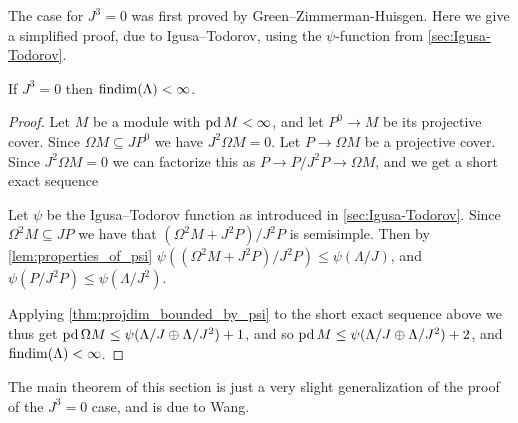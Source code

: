 The case for $J^3=0$ was first proved by Green--Zimmerman-Huisgen\cite[Theorem~16]{GZH91}. Here we give a simplified proof, due to Igusa--Todorov, using the $\psi$-function from \cref{sec:Igusa-Todorov}.

\begin{theorem}\cite[Corollary~6]{IgTo05}\label{thm:J3_equals_0_implies_FDC}
	If $J^3=0$ then $\operatorname{findim}(\Lambda) < \infty$.
	\begin{proof}
		Let $M$ be a module with $\operatorname{pd} M < \infty$, and let $P^0 \to M$ be its projective cover. Since $\Omega M \subseteq JP^0$ we have $J^2\Omega M = 0$. Let $P \to \Omega M$ be a projective cover. Since $J^2\Omega M = 0$ we can factorize this as $P \to P/J^2P \to \Omega M$, and we get a short exact sequence
		\begin{center}
		\end{center}
		Let $\psi$ be the Igusa--Todorov function as introduced in \cref{sec:Igusa-Todorov}. Since $\Omega^2 M \subseteq JP$ we have that $(\Omega^2 M + J^2P) / J^2 P$ is semisimple. Then by \cref{lem:properties_of_psi} $\psi((\Omega^2 M + J^2P) / J^2 P) \leq \psi(\Lambda / J)$, and $\psi(P / J^2 P) \leq \psi(\Lambda / J^2)$.
		
		Applying \cref{thm:projdim_bounded_by_psi} to the short exact sequence above we thus get $\operatorname{pd} \Omega M \leq \psi(\Lambda / J \oplus \Lambda / J^2) + 1$, and so $\operatorname{pd} M \leq \psi(\Lambda / J \oplus \Lambda / J^2) + 2$, and $\operatorname{findim}(\Lambda) < \infty$.
	\end{proof}
\end{theorem}

The main theorem of this section is just a very slight generalization of the proof of the $J^3=0$ case, and is due to Wang. 

